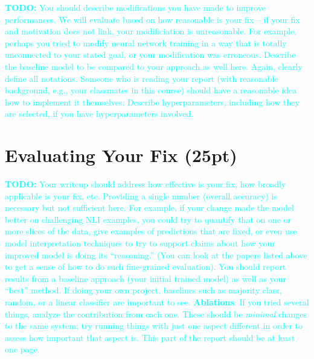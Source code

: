\documentclass[twocolumn]{article}
\newcommand{\todo}[1]{\textcolor{cyan}{\textbf{TODO:} #1}}
\begin{document}
\todo{You should describe modifications you have made to improve performances.
We will evaluate based on how reasonable is your fix  -- if your fix and
motivation does not link, your modificiation is unreasonable. For example,
perhaps you tried to modify neural network training in a way that is totally
unconnected to your stated goal, or your modification was erroneous. Describe
the baseline model to be compared to your approach as well here. Again, clearly
define all notations. Someone who is reading your report (with reasonable
background, e.g., your classmates in this course) should have a reasonable idea
how to implement it themselves. Describe hyperparameters, including how they
are selected, if you have hyperparameters involved. }

\section{Evaluating Your Fix (25pt)}


\todo{
Your writeup should address how effective is your fix, how broadly applicable
is your fix, etc. Providing a single number (overall accuracy) is necessary but
not sufficient here. For example, if your change made the model better on
challenging NLI examples, you could try to quantify that on one or more slices
of the data, give examples of predictions that are fixed, or even use model
interpretation techniques to try to support claims about how your improved
model is doing its ``reasoning.'' (You can look at the papers listed above to
get a sense of how to do such fine-grained evaluation).  You should report
results from a baseline approach (your initial trained model) as well as your
``best'' method. If doing your own project, baselines such as majority class,
random, or a linear classifier are important to see. \textbf{Ablations}: If you
tried several things, analyze the contribution from each one. These should be
\emph{minimal} changes to the same system; try running things with just one
aspect different in order to assess how important that aspect is. This part of
the report should be at least one page.}


\end{document}
